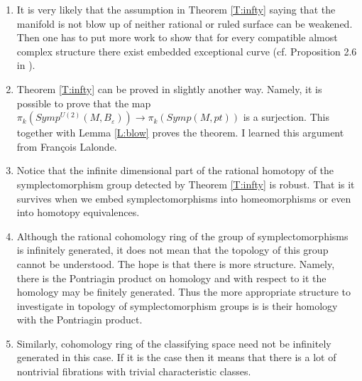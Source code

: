 \documentclass[a4paper,14pt]{article}
\newcommand{\eps}{{\varepsilon}}
\numberwithin{equation}{section}
\numberwithin{figure}{section}
\begin{document}
\begin{enumerate}
\item It is very likely that the assumption in Theorem \ref{T:infty} 
saying that the manifold is not blow up of neither rational or ruled
surface can be weakened. Then one has to put more work to show that
for every compatible almost complex structure there exist embedded
exceptional curve (cf. Proposition 2.6 in \cite{lp}).

\item
Theorem \ref{T:infty} can be proved in slightly another way.
Namely, it is possible to prove that the map
$\pi_k(Symp^{U(2)}(M,B_{\eps})) \to \pi_k( Symp(M,pt))$
is a surjection. This together with Lemma \ref{L:blow}
proves the theorem. I learned this argument from
Fran\c cois Lalonde.

\item Notice that the infinite dimensional part
of the rational homotopy of the symplectomorphism group
detected by Theorem \ref{T:infty} is robust. That is
it survives when we embed symplectomorphisms into
homeomorphisms or even into homotopy equivalences.

\item Although the rational cohomology ring of the group
of symplectomorphisms is infinitely generated, it does not
mean that the topology of this group cannot be understood.
The hope is that there is more structure. Namely, there
is the Pontriagin product on homology and with respect
to it the homology may be finitely generated. 
Thus the more appropriate structure to investigate 
in topology of symplectomorphism groups is
is their homology with the Pontriagin product. 

\item 
Similarly, cohomology ring of the classifying space
need not be infinitely generated in this case. If it is
the case then it means that there is a lot of nontrivial
fibrations with trivial characteristic classes.



\end{enumerate}
\end{document}
